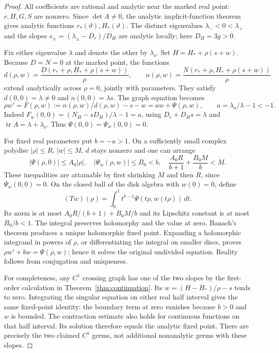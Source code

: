 \documentclass[12pt,a4paper,oneside]{report}
\numberwithin{equation}{chapter}
\theoremstyle{remark}\newtheorem{remark}[theorem]{Remark}
\begin{document}
\begin{proof}
All coefficients are rational and analytic near the marked real point:
$r,H,G,S$ are nonzero. Since $\det A\ne0$, the analytic implicit-function
theorem gives analytic functions $r_*(\vartheta),H_*(\vartheta)$.
The distinct eigenvalues $\lambda_-<0<\lambda_+$ and the slopes
$s_\pm=(\lambda_\pm-D_r)/D_H$ are analytic locally; here $D_H=3g>0$.

Fix either eigenvalue $\lambda$ and denote the other by $\lambda_o$.
Set $H=H_*+\rho(s+w)$. Because $D=N=0$ at the marked point, the functions
\[
 d(\rho,w)=\frac{D(r_*+\rho,H_*+\rho(s+w))}{\rho},\qquad
 n(\rho,w)=\frac{N(r_*+\rho,H_*+\rho(s+w))}{\rho}
\]
extend analytically across $\rho=0$, jointly with parameters. They satisfy
$d(0,0)=\lambda\ne0$ and $n(0,0)=\lambda s$. The graph equation becomes
\[
 \rho w'=F(\rho,w):=n(\rho,w)/d(\rho,w)-s-w
                 =a w+\Psi(\rho,w),
 \qquad a=\lambda_o/\lambda-1<-1.
\]
Indeed $F_w(0,0)=(N_H-sD_H)/\lambda-1=a$, using
$D_r+D_Hs=\lambda$ and $\operatorname{tr}A=\lambda+\lambda_o$.
Thus $\Psi(0,0)=\Psi_w(0,0)=0$.

For fixed real parameters put $b=-a>1$. On a sufficiently small complex
polydisc $|\rho|\le R$, $|w|\le M$, $d$ stays nonzero and one can arrange
\[
 |\Psi(\rho,0)|\le A_0|\rho|,\quad
 |\Psi_w(\rho,w)|\le B_0<b,\quad
 \frac{A_0R}{b+1}+\frac{B_0M}{b}<M.
\]
These inequalities are attainable by first shrinking $M$ and then $R$,
since $\Psi_w(0,0)=0$. On the closed ball of the disk algebra with
$w(0)=0$, define
\[
 (Tw)(\rho)=\int_0^1 t^{b-1}\Psi(t\rho,w(t\rho))\,dt.
\]
Its norm is at most $A_0R/(b+1)+B_0M/b$ and its Lipschitz constant is at
most $B_0/b<1$. The integral preserves holomorphy and the value at zero.
Banach's theorem produces a unique holomorphic fixed point. Expanding a
holomorphic integrand in powers of $\rho$, or differentiating the integral
on smaller discs, proves $\rho w'+bw=\Psi(\rho,w)$; hence it solves the
original undivided equation. Reality follows from conjugation and uniqueness.

For completeness, any $C^1$ crossing graph has one of the two slopes by
the first-order calculation in Theorem~\ref{thm:continuation}. Its
$w=(H-H_*)/\rho-s$ tends to zero. Integrating the singular equation on
either real half interval gives the same fixed-point identity: the boundary
term at zero vanishes because $b>0$ and $w$ is bounded. The contraction
estimate also holds for continuous functions on that half interval. Its
solution therefore equals the analytic fixed point. There are precisely
the two claimed $C^1$ germs, not additional nonanalytic germs with these
slopes.


\end{proof}
\end{document}
